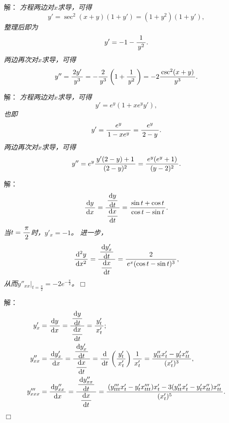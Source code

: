 \begin{frame}
	\linespread{1.5}
	\pause
	
	
	\small 解：\it
	方程两边对$x$求导，可得
	$$y'=\sec^2(x+y)(1+y')=(1+y^2)(1+y'),$$
	\pause 整理后即为
	$$y'=-1-\df1{y^2}.$$
	\pause 两边再次对$x$求导，可得
	$$y''=\df{2y'}{y^3}=-\df2{y^3}\left(1+\df1{y^2}\right)
	=-2\df{\csc^2(x+y)}{y^3}.$$
\end{frame}

\begin{frame}
	\linespread{1.5}
	\pause
	
	
	\small 解：\it
	方程两边对$x$求导，可得
	$$y'=e^y(1+xe^yy'),$$
	也即
	$$y'=\df{e^y}{1-xe^y}=\df{e^y}{2-y}.$$
	\pause 两边再次对$x$求导，可得
	$$y''=e^y\df{y'(2-y)+1}{(2-y)^2}=\df{e^y(e^y+1)}{(y-2)^2}.$$
\end{frame}

\begin{frame}
	\linespread{1.5}
	\pause
	
	
	\small 解：\it
	$$\df{\d y}{\d x}=\df{\df{\d y}{\d t}}{\df{\d x}{\d t}}
	=\df{\sin t+\cos t}{\cos t-\sin t}.$$
	当$t=\df{\pi}2$时，$y'_x=-1$。
	\pause 进一步，
	$$\df{\d^2 y}{\d x^2}
	=\df{\df{\d y'_x}{\d t}}{\df{\d x}{\d t}}
	=\df{2}{e^x(\cos t-\sin t)^3},$$
	从而$y''_{xx}|_{t=\frac{\pi}2}=-2e^{-\frac{\pi}2}$。\hfill$\Box$
\end{frame}

\begin{frame}
	\linespread{1.5}
	\pause
	
	\bigskip
	
	\small 解：\it
	\begin{align*}
		y'_x&=\df{\d y}{\d x}=\df{\df{\d y}{\d t}}{\df{\d x}{\d t}}
		=\df{y'_t}{x'_t};\\
		y''_{xx}&=\df{\d y'_x}{\d x}=\df{\df{\d y'_x}{\d t}}{\df{\d x}{\d t}}
		=\df{\d }{\d t}\left(\df{y'_t}{x'_t}\right)\df{1}{x'_t}
		=\df{y''_{tt}x'_t-y'_tx''_{tt}}{(x'_t)^3},\\
		y'''_{xxx}&=\df{\d y''_{xx}}{\d x}
		=\df{\df{\d y''_{xx}}{\d t}}{\df{\d x}{\d t}}
		=\df{(y'''_{ttt}x'_t-y'_tx'''_{ttt})x'_t
		-3(y''_{tt}x'_t-y'_tx''_{tt})x''_{tt}}{(x'_t)^5}.
	\end{align*}
	\hfill$\Box$
\end{frame}

